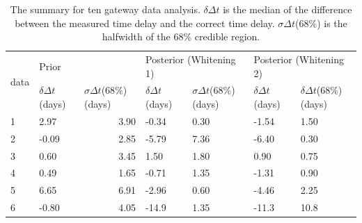 \documentclass[\docopts]{\docclass}
\begin{document}
\begin{table}[]
\centering
\caption{The summary for ten gateway data analysis. $\delta \Delta t$ is the median of the difference between the measured time delay and the correct time delay. $\sigma\Delta t$($68\%$) is the halfwidth of the $68\%$ credible region.}
\label{tab:summary}
\begin{tabular}{|l|l|r|l|l|l|l|}
\hline
\multicolumn{1}{|c|}{\multirow{2}{*}{data}} & \multicolumn{2}{l|}{Prior}                                                    & \multicolumn{2}{l|}{Posterior (Whitening 1)}              & \multicolumn{2}{l|}{Posterior (Whitening 2)}              \\ \cline{2-7} 
\multicolumn{1}{|c|}{}                      & $\delta\Delta t$(days) & \multicolumn{1}{l|}{$\sigma\Delta t$(68$\%$) (days)} & $\delta\Delta t$ (days) & $\sigma\Delta t$(68$\%$) (days) & $\delta\Delta t$ (days) & $\delta\Delta t$(68$\%$) (days) \\ \hline
1                                           & 2.97                   & 3.90                                                 & -0.34                   & 0.30                            & -1.54                   & 1.50                            \\ \hline
2                                           & -0.09                  & 2.85                                                 & -5.79                   & 7.36                            & -6.40                   & 0.30                            \\ \hline
3                                           & 0.60                   & 3.45                                                 & 1.50                    & 1.80                            & 0.90                    & 0.75                            \\ \hline
4                                           & 0.49                   & 1.65                                                 & -0.71                   & 1.35                            & -1.31                   & 0.90                            \\ \hline
5                                           & 6.65                   & 6.91                                                 & -2.96                   & 0.60                            & -4.46                   & 2.25                            \\ \hline
6                                           & -0.80                  & 4.05                                                 & -14.9                   & 1.35                            & -11.3                  & 10.8                            \\ \hline

\end{tabular}
\end{table}
\end{document}
